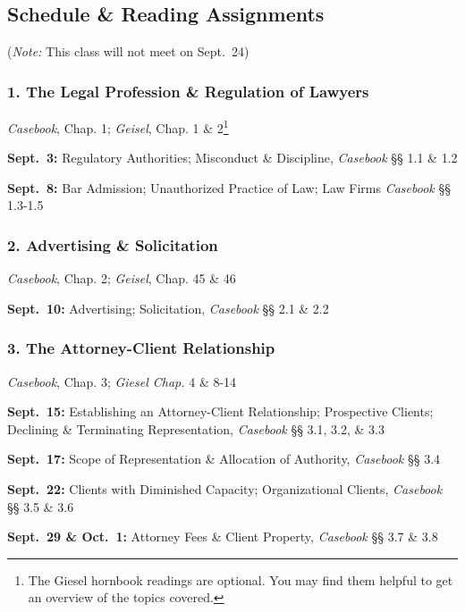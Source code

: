 \documentclass[11pt,letterpaper,twoside]{article}
\begin{document}
\subsection{Schedule \& Reading
Assignments}\label{schedule-reading-assignments}

(\emph{Note:} This class will not meet on Sept.~24)

\subsubsection{1. The Legal Profession \& Regulation of
Lawyers}\label{the-legal-profession-regulation-of-lawyers}

\emph{Casebook}, Chap. 1; \emph{Geisel}, Chap. 1 \& 2\footnote{The
  Giesel hornbook readings are optional. You may find them helpful to
  get an overview of the topics covered.}

\textbf{Sept.~3:} Regulatory Authorities; Misconduct \& Discipline,
\emph{Casebook} §§ 1.1 \& 1.2

\textbf{Sept.~8:} Bar Admission; Unauthorized Practice of Law; Law Firms
\emph{Casebook} §§ 1.3-1.5

\subsubsection{2. Advertising \&
Solicitation}\label{advertising-solicitation}

\emph{Casebook}, Chap. 2; \emph{Geisel}, Chap. 45 \& 46

\textbf{Sept.~10:} Advertising; Solicitation, \emph{Casebook} §§ 2.1 \&
2.2

\subsubsection{3. The Attorney-Client
Relationship}\label{the-attorney-client-relationship}

\emph{Casebook}, Chap. 3; \emph{Giesel Chap.} 4 \& 8-14

\textbf{Sept.~15:} Establishing an Attorney-Client Relationship;
Prospective Clients; Declining \& Terminating Representation,
\emph{Casebook} §§ 3.1, 3.2, \& 3.3

\textbf{Sept.~17:} Scope of Representation \& Allocation of Authority,
\emph{Casebook} §§ 3.4

\textbf{Sept.~22:} Clients with Diminished Capacity; Organizational
Clients, \emph{Casebook} §§ 3.5 \& 3.6

\textbf{Sept.~29 \& Oct.~1:} Attorney Fees \& Client Property,
\emph{Casebook} §§ 3.7 \& 3.8
\end{document}
